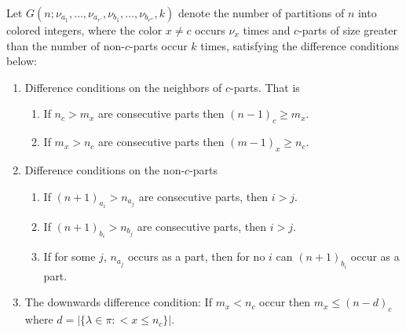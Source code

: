 \documentclass[12pt,a4paper]{amsart}
\theoremstyle{definition}
\theoremstyle{notation}
\theoremstyle{corollary}
\begin{document}
Let $G(n;\nu_{a_1},\dots,\nu_{a_{r'}},\nu_{b_1},\dots,\nu_{b_{r''}},k)$ denote the number of partitions of $n$ into colored integers, where the color $x\not=c$ occurs $\nu_x$ times and $c$-parts of size greater than the number of non-$c$-parts occur $k$ times, satisfying the difference conditions below:
\begin{enumerate}[label=(\Roman*),ref=\Roman*]
    \item Difference conditions on the neighbors of $c$-parts. That is
    \begin{enumerate}[label=(\theenumi.\roman*),ref=\theenumi.\roman*]
        \item If $n_c>m_x$ are consecutive parts then $(n-1)_c\geq m_x$.
        \item If $m_x>n_c$ are consecutive parts then $(m-1)_x\geq n_c$.
    \end{enumerate}
    \item Difference conditions on the non-$c$-parts
    \begin{enumerate}[label=(\theenumi.\roman*),ref=\theenumi.\roman*]
        \item If $(n+1)_{a_i}>n_{a_j}$ are consecutive parts, then $i>j$.
        \item If $(n+1)_{b_i}>n_{b_j}$ are consecutive parts, then $i>j$.
        \item If for some $j$, $n_{a_j}$ occurs as a part, then for no $i$ can $(n+1)_{b_i}$ occur as a part.
    \end{enumerate}
    
    \item The downwards difference condition: If $m_x<n_c$ occur then $m_x\leq(n-d)_c$ where $d=|\{\lambda\in \pi :<x\leq n_c\}|$.
         
    
\end{enumerate}
\end{document}
